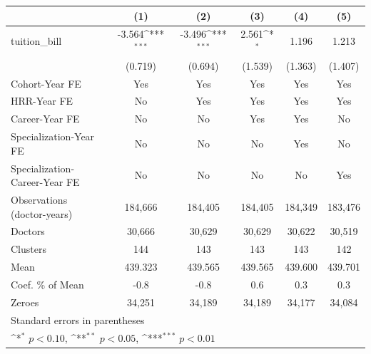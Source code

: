 {
\def\sym#1{\ifmmode^{#1}\else\(^{#1}\)\fi}
\begin{tabular}{l*{5}{c}}
\hline\hline
                    &\multicolumn{1}{c}{(1)}         &\multicolumn{1}{c}{(2)}         &\multicolumn{1}{c}{(3)}         &\multicolumn{1}{c}{(4)}         &\multicolumn{1}{c}{(5)}         \\
\hline
tuition\_bill        &      -3.564\sym{***}&      -3.496\sym{***}&       2.561\sym{*}  &       1.196         &       1.213         \\
                    &     (0.719)         &     (0.694)         &     (1.539)         &     (1.363)         &     (1.407)         \\
[1em]
Cohort-Year FE      &         Yes         &         Yes         &         Yes         &         Yes         &         Yes         \\
[1em]
HRR-Year FE         &          No         &         Yes         &         Yes         &         Yes         &         Yes         \\
[1em]
Career-Year FE      &          No         &          No         &         Yes         &         Yes         &          No         \\
[1em]
Specialization-Year FE&          No         &          No         &          No         &         Yes         &          No         \\
[1em]
Specialization-Career-Year FE&          No         &          No         &          No         &          No         &         Yes         \\
\hline
Observations (doctor-years)&     184,666         &     184,405         &     184,405         &     184,349         &     183,476         \\
Doctors             &      30,666         &      30,629         &      30,629         &      30,622         &      30,519         \\
Clusters            &         144         &         143         &         143         &         143         &         142         \\
Mean                &     439.323         &     439.565         &     439.565         &     439.600         &     439.701         \\
Coef. \% of Mean    &        -0.8         &        -0.8         &         0.6         &         0.3         &         0.3         \\
Zeroes              &      34,251         &      34,189         &      34,189         &      34,177         &      34,084         \\
\hline\hline
\multicolumn{6}{l}{\footnotesize Standard errors in parentheses}\\
\multicolumn{6}{l}{\footnotesize \sym{*} \(p<0.10\), \sym{**} \(p<0.05\), \sym{***} \(p<0.01\)}\\
\end{tabular}
}
